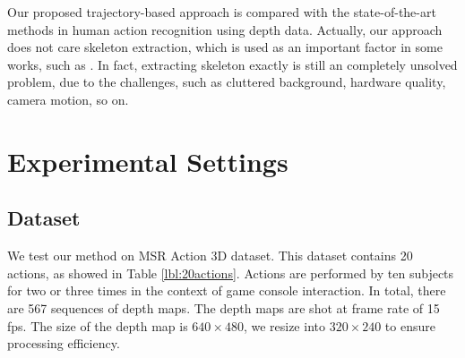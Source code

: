 \documentclass[review]{elsarticle}
\begin{document}

Our proposed trajectory-based approach is compared with the state-of-the-art methods in human action recognition using depth data. Actually, our approach does not care skeleton extraction, which is used as an important factor in some works, such as \cite{wang2012mining, yang2012eigenjoints}. In fact, extracting skeleton exactly is still an completely unsolved problem, due to the challenges, such as cluttered background, hardware quality, camera motion, so on.

\section{Experimental Settings}
\label{lbl:ExperimentalSettings}

\subsection{Dataset}
\label{lbl:ExperimentalSettings_Dataset}
We test our method on MSR Action 3D dataset. This dataset contains 20 actions, as showed in Table \ref{lbl:20actions}. Actions are performed by ten subjects for two or three times in the context of game console interaction. In total, there are 567 sequences of depth maps. The depth maps are shot at frame rate of 15 fps. The size of the depth map is $640 \times 480$, we resize into $320 \times 240$ to ensure processing efficiency.
\end{document}
